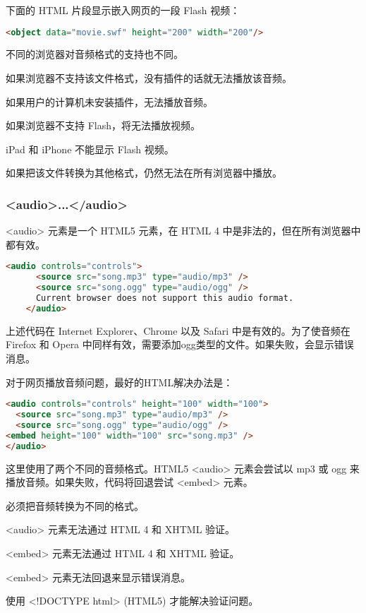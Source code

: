 下面的 HTML 片段显示嵌入网页的一段 Flash 视频：


\begin{lstlisting}[language=HTML]
	<object data="movie.swf" height="200" width="200"/>
\end{lstlisting}


\begin{compactitem}
\item 不同的浏览器对音频格式的支持也不同。
\item 如果浏览器不支持该文件格式，没有插件的话就无法播放该音频。
\item 如果用户的计算机未安装插件，无法播放音频。
\item 如果浏览器不支持 Flash，将无法播放视频。
\item iPad 和 iPhone 不能显示 Flash 视频。
\item 如果把该文件转换为其他格式，仍然无法在所有浏览器中播放。
\end{compactitem}

\subsubsection{<audio>...</audio>}

<audio> 元素是一个 HTML5 元素，在 HTML 4 中是非法的，但在所有浏览器中都有效。

\begin{lstlisting}[language=HTML]
	<audio controls="controls">
	  <source src="song.mp3" type="audio/mp3" />
	  <source src="song.ogg" type="audio/ogg" />
	  Current browser does not support this audio format.
	</audio>
\end{lstlisting}

上述代码在 Internet Explorer、Chrome 以及 Safari 中是有效的。为了使音频在 Firefox 和 Opera 中同样有效，需要添加ogg类型的文件。如果失败，会显示错误消息。


对于网页播放音频问题，最好的HTML解决办法是：

\begin{lstlisting}[language=HTML]
<audio controls="controls" height="100" width="100">
  <source src="song.mp3" type="audio/mp3" />
  <source src="song.ogg" type="audio/ogg" />
<embed height="100" width="100" src="song.mp3" />
</audio>
\end{lstlisting}

这里使用了两个不同的音频格式。HTML5 <audio> 元素会尝试以 mp3 或 ogg 来播放音频。如果失败，代码将回退尝试 <embed> 元素。

\begin{compactitem}
\item 必须把音频转换为不同的格式。
\item <audio> 元素无法通过 HTML 4 和 XHTML 验证。
\item <embed> 元素无法通过 HTML 4 和 XHTML 验证。
\item <embed> 元素无法回退来显示错误消息。
\item 使用 <!DOCTYPE html> (HTML5) 才能解决验证问题。
\end{compactitem}

